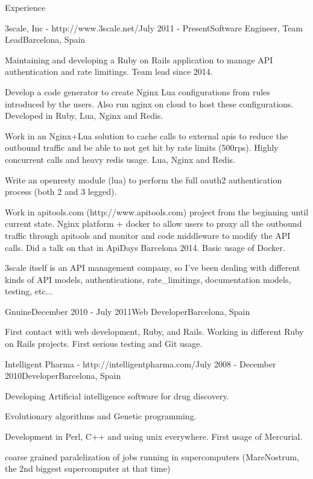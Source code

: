 \documentclass{resume} %
\begin{document}
\begin{rSection}{Experience}

\begin{rSubsection}{3scale, Inc - http://www.3scale.net/}{July 2011 - Present}{Software Engineer, Team Lead}{Barcelona, Spain}
\item Maintaining and developing a Ruby on Rails application to manage
  API authentication and rate limitings. Team lead since 2014.
\item Develop a code generator to create Nginx Lua configurations from
  rules introduced by the users. Also run nginx on cloud to host these
  configurations. Developed in Ruby, Lua, Nginx and Redis.
\item Work in an Nginx+Lua solution to cache calls to external apis to
  reduce the outbound traffic and be able to not get hit by rate
  limits (500rps). Highly concurrent calls and heavy redis usage. Lua,
  Nginx and Redis.
\item Write an openresty module (lua) to perform the full oauth2
  authentication process (both 2 and 3 legged).
\item Work in apitools.com (http://www.apitools.com) project from the
  beginning until current state. Nginx platform + docker to allow
  users to proxy all the outbound traffic through apitools and monitor
  and code middleware to modify the API calls. Did a talk on that in
  ApiDays Barcelona 2014. Basic usage of Docker.
\item 3scale itself is an API management company, so I've been dealing
  with different kinds of API models, authentications,
  rate\_limitings, documentation models, testing, etc...
\end{rSubsection}


\begin{rSubsection}{Gnuine}{December 2010 - July 2011}{Web Developer}{Barcelona, Spain}
\item First contact with web development, Ruby, and Rails. Working in
  different Ruby on Rails projects. First serious testing and Git
  usage.
\end{rSubsection}


\begin{rSubsection}{Intelligent Pharma - http://intelligentpharma.com/}{July 2008 - December 2010}{Developer}{Barcelona, Spain}
\item Developing Artificial intelligence software for drug discovery.
\item Evolutionary algorithms and Genetic programming.
\item Development in Perl, C++ and using unix everywhere. First usage of Mercurial.
\item coarse grained paralelization of jobs running in supercomputers
  (MareNostrum, the 2nd biggest supercomputer at that time)
\end{rSubsection}



\end{rSection}
\end{document}
